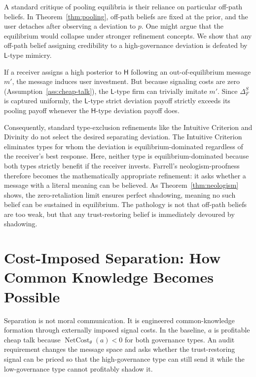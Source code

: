 \documentclass[review,authoryear]{elsarticle}
\theoremstyle{definition}
\theoremstyle{plain}
\begin{document}
A standard critique of pooling equilibria is their reliance on particular off-path beliefs. In Theorem~\ref{thm:pooling}, off-path beliefs are fixed at the prior, and the user detaches after observing a deviation to $p$. One might argue that the equilibrium would collapse under stronger refinement concepts. We show that any off-path belief assigning credibility to a high-governance deviation is defeated by $\mathsf{L}$-type mimicry. 

If a receiver assigns a high posterior to $\mathsf{H}$ following an out-of-equilibrium message $m'$, the message induces user investment. But because signaling costs are zero (Assumption~\ref{ass:cheap-talk}), the $\mathsf{L}$-type firm can trivially imitate $m'$. Since $\Delta_F^S$ is captured uniformly, the $\mathsf{L}$-type strict deviation payoff strictly exceeds its pooling payoff whenever the $\mathsf{H}$-type deviation payoff does. 

Consequently, standard type-exclusion refinements like the Intuitive Criterion \citep{cho_kreps1987} and Divinity \citep{banks_sobel1987} do not select the desired separating deviation. The Intuitive Criterion eliminates types for whom the deviation is equilibrium-dominated regardless of the receiver's best response. Here, neither type is equilibrium-dominated because both types strictly benefit if the receiver invests. Farrell's neologism-proofness \citep{farrell1993} therefore becomes the mathematically appropriate refinement: it asks whether a message with a literal meaning can be believed. As Theorem~\ref{thm:neologism} shows, the zero-retaliation limit ensures perfect shadowing, meaning no such belief can be sustained in equilibrium. The pathology is not that off-path beliefs are too weak, but that any trust-restoring belief is immediately devoured by shadowing.

\section{Cost-Imposed Separation: How Common Knowledge Becomes Possible}
\label{sec:cheap-talk}

Separation is not moral communication.  It is engineered common-knowledge formation through externally imposed signal costs.  In the baseline, $a$ is profitable cheap talk because $\operatorname{NetCost}_{\theta}(a)<0$ for both governance types.  An audit requirement changes the message space and asks whether the trust-restoring signal can be priced so that the high-governance type can still send it while the low-governance type cannot profitably shadow it.
\end{document}
